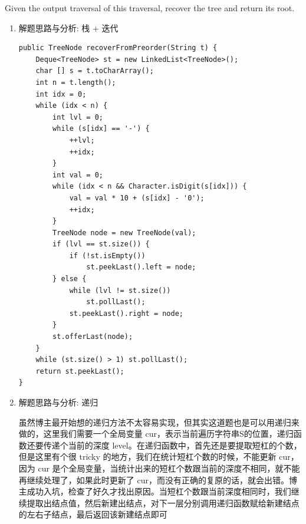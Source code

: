 \documentclass[9pt, b5paaper]{book}
\begin{document}
Given the output traversal of this traversal, recover the tree and return its root.
\begin{enumerate}
\item 解题思路与分析: 栈 + 迭代
\label{sec-3-0-4-1}
\begin{verbatim}
public TreeNode recoverFromPreorder(String t) {
    Deque<TreeNode> st = new LinkedList<TreeNode>();
    char [] s = t.toCharArray();
    int n = t.length();
    int idx = 0;
    while (idx < n) {
        int lvl = 0;
        while (s[idx] == '-') {
            ++lvl;
            ++idx;
        }
        int val = 0;
        while (idx < n && Character.isDigit(s[idx])) {
            val = val * 10 + (s[idx] - '0');
            ++idx;
        }
        TreeNode node = new TreeNode(val);
        if (lvl == st.size()) {
            if (!st.isEmpty()) 
                st.peekLast().left = node;
        } else {
            while (lvl != st.size()) 
                st.pollLast();
            st.peekLast().right = node;
        }
        st.offerLast(node);
    }
    while (st.size() > 1) st.pollLast();
    return st.peekLast();
}
\end{verbatim}
\item 解题思路与分析: 递归
\label{sec-3-0-4-2}

虽然博主最开始想的递归方法不太容易实现，但其实这道题也是可以用递归来做的，这里我们需要一个全局变量 cur，表示当前遍历字符串S的位置，递归函数还要传递个当前的深度 level。在递归函数中，首先还是要提取短杠的个数，但是这里有个很 tricky 的地方，我们在统计短杠个数的时候，不能更新 cur，因为 cur 是个全局变量，当统计出来的短杠个数跟当前的深度不相同，就不能再继续处理了，如果此时更新了 cur，而没有正确的复原的话，就会出错。博主成功入坑，检查了好久才找出原因。当短杠个数跟当前深度相同时，我们继续提取出结点值，然后新建出结点，对下一层分别调用递归函数赋给新建结点的左右子结点，最后返回该新建结点即可


\end{enumerate}
\end{document}

